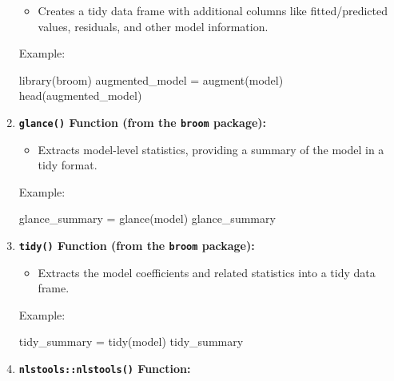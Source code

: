 \documentclass[
]{article}
\newenvironment{Shaded}{}{}
\newcommand{\FunctionTok}[1]{\textcolor[rgb]{0.02,0.16,0.49}{#1}}
\newcommand{\NormalTok}[1]{#1}
\newcommand{\OtherTok}[1]{\textcolor[rgb]{0.00,0.44,0.13}{#1}}
\begin{document}
\begin{enumerate}
  \begin{itemize}
  \item
    Creates a tidy data frame with additional columns like
    fitted/predicted values, residuals, and other model information.
  \end{itemize}

  Example:

\begin{Shaded}
\begin{Highlighting}[]
\FunctionTok{library}\NormalTok{(broom)}
\NormalTok{augmented\_model }\OtherTok{=} \FunctionTok{augment}\NormalTok{(model)}
\FunctionTok{head}\NormalTok{(augmented\_model)}
\end{Highlighting}
\end{Shaded}
\item
  \textbf{\texttt{glance()} Function (from the \texttt{broom} package):}

  \begin{itemize}
  \item
    Extracts model-level statistics, providing a summary of the model in
    a tidy format.
  \end{itemize}

  Example:

\begin{Shaded}
\begin{Highlighting}[]
\NormalTok{glance\_summary }\OtherTok{=} \FunctionTok{glance}\NormalTok{(model)}
\NormalTok{glance\_summary}
\end{Highlighting}
\end{Shaded}
\item
  \textbf{\texttt{tidy()} Function (from the \texttt{broom} package):}

  \begin{itemize}
  \item
    Extracts the model coefficients and related statistics into a tidy
    data frame.
  \end{itemize}

  Example:

\begin{Shaded}
\begin{Highlighting}[]
\NormalTok{tidy\_summary }\OtherTok{=} \FunctionTok{tidy}\NormalTok{(model)}
\NormalTok{tidy\_summary}
\end{Highlighting}
\end{Shaded}
\item
  \textbf{\texttt{nlstools::nlstools()} Function:}


\end{enumerate}
\end{document}
